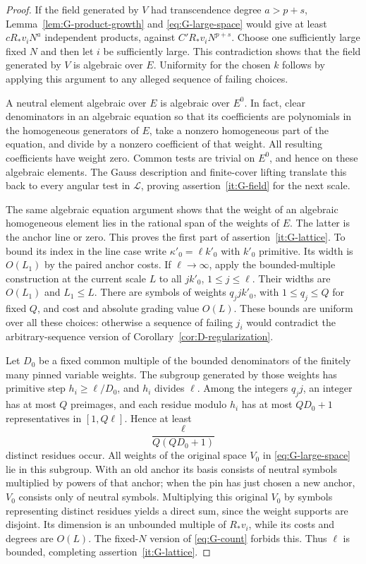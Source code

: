 \begin{proof}
If the field generated by $V$ had transcendence degree $a>p+s$,
Lemma~\ref{lem:G-product-growth} and \eqref{eq:G-large-space} would give
at least $cR_*v_iN^a$ independent products, against
$C'R_*v_iN^{p+s}$.  Choose one sufficiently large fixed $N$ and then let
$i$ be sufficiently large.  This contradiction shows that the field
generated by $V$ is algebraic over $E$.  Uniformity for the chosen $k$ follows by
applying this argument to any alleged sequence of failing choices.

A neutral element algebraic over $E$ is algebraic over $E^0$.  In fact,
clear denominators in an algebraic equation so that its coefficients
are polynomials in the homogeneous generators of $E$, take a nonzero
homogeneous part of the equation, and divide by a nonzero coefficient of
that weight.  All resulting coefficients have weight zero.  Common
tests are trivial on $E^0$, and hence on these algebraic elements.  The
Gauss description and finite-cover lifting translate this back to every
angular test in $\mathcal L$, proving assertion~\ref{it:G-field} for the
next scale.

The same algebraic equation argument shows that the weight of an
algebraic homogeneous element lies in the rational span of the weights
of $E$.  The latter is the anchor line or zero.  This proves the first
part of assertion~\ref{it:G-lattice}.  To bound its index in the line
case write $\kappa'_0=\ell k'_0$ with $k'_0$ primitive.  Its width is
$O(L_1)$ by the paired anchor costs.  If $\ell\to\infty$, apply the
bounded-multiple construction at the current scale $L$ to all $jk'_0$,
$1\le j\le\ell$.  Their widths are $O(L_1)$ and $L_1\le L$.
There are symbols of weights $q_jjk'_0$, with
$1\le q_j\le Q$ for fixed $Q$, and cost and absolute grading value
$O(L)$.  These bounds are uniform over all these choices: otherwise a
sequence of failing $j_i$ would contradict the arbitrary-sequence
version of Corollary~\ref{cor:D-regularization}.

Let $D_0$ be a fixed common multiple of the bounded denominators of the
finitely many pinned variable weights.  The subgroup generated by those
weights has primitive step $h_i\ge\ell/D_0$, and $h_i$ divides $\ell$.
Among the integers $q_jj$, an integer has at most $Q$ preimages, and each
residue modulo $h_i$ has at most $QD_0+1$ representatives in
$[1,Q\ell]$.  Hence at least
\[
                         \frac{\ell}{Q(QD_0+1)}
\]
distinct residues occur.  All weights of the original space $V_0$ in
\eqref{eq:G-large-space} lie in this subgroup.  With an old anchor its
basis consists of neutral symbols multiplied by powers of that anchor;
when the pin has just chosen a new anchor, $V_0$ consists only of neutral
symbols.
Multiplying this original $V_0$ by symbols representing distinct residues yields a
direct sum, since the weight supports are disjoint.  Its dimension is
an unbounded multiple of $R_*v_i$, while its costs and degrees are
$O(L)$.  The fixed-$N$ version of \eqref{eq:G-count} forbids this.
Thus $\ell$ is bounded, completing assertion~\ref{it:G-lattice}.

\end{proof}

